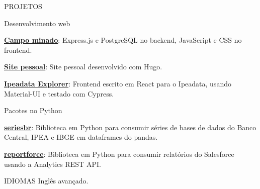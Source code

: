 \documentclass{resume}
\begin{document}

\begin{rSection}{PROJETOS}
  \begin{rSubsection}{Desenvolvimento web}{}{}
  \item
  \item \href{https://github.com/phelipetls/minesweeper.js}{\textbf{Campo
    minado}}: Express.js e PostgreSQL no backend, JavaScript e CSS no
    frontend.
  \item \href{https://phelipetls.github.io}{\textbf{Site pessoal}}: Site pessoal
    desenvolvido com Hugo.
  \item \href{http://ipeadata-explorer.surge.sh}{\textbf{Ipeadata Explorer}}:
    Frontend escrito em React para o Ipeadata, usando Material-UI e testado com
    Cypress.
    \vspace{5mm}
  \end{rSubsection}

  \begin{rSubsection}{Pacotes no Python}{}{}
  \item
  \item \href{https://github.com/phelipetls/seriesbr}{\textbf{seriesbr}}:
    Biblioteca em Python para consumir séries de bases de dados do Banco
    Central, IPEA e IBGE em dataframes do pandas.
  \item \href{https://github.com/phelipetls/reportforce}{\textbf{reportforce}}:
    Biblioteca em Python para consumir relatórios do Salesforce usando a
    Analytics REST API.
    \vspace{5mm}
  \end{rSubsection}
\end{rSection}


\begin{rSection}{IDIOMAS} \itemsep -3pt
    {Inglês avançado.}
\end{rSection}
\end{document}
